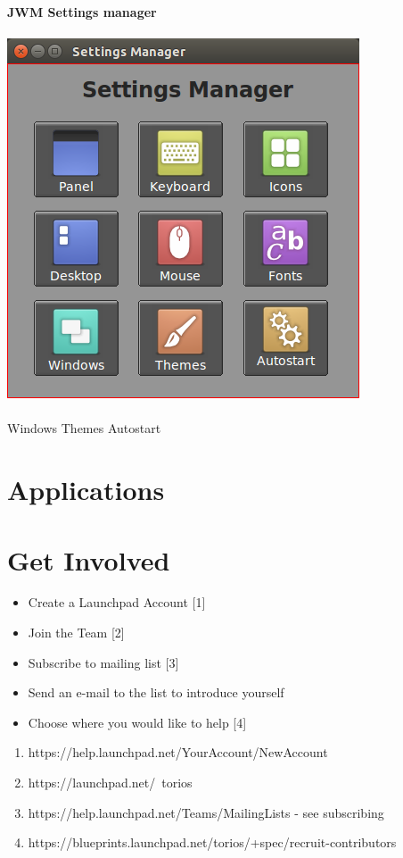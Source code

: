 \documentclass[12pt,a4paper]{book}
\begin{document}
{\large \textbf{JWM Settings manager}} \\ \\
\includegraphics{jwmsettingsmanager}
\\
\\








{Windows}
{Themes}
{Autostart}


\chapter{Applications}

\chapter{Get Involved}

\begin{itemize}
\item{Create a Launchpad Account [1]}
\item{Join the Team [2]}
\item{Subscribe to mailing list [3]}
\item{Send an e-mail to the list to introduce yourself}
\item{Choose where you would like to help [4]}
\end{itemize}


\begin{enumerate}
\item {https://help.launchpad.net/YourAccount/NewAccount}
\item {https://launchpad.net/~torios}
\item {https://help.launchpad.net/Teams/MailingLists - see subscribing}
\item {https://blueprints.launchpad.net/torios/+spec/recruit-contributors}

\end{enumerate}
\end{document}
